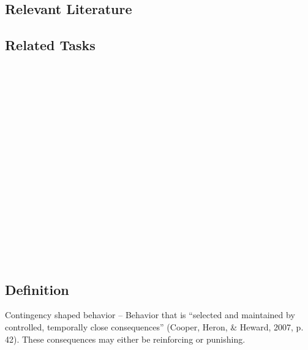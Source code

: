 \subsection{Relevant Literature}
\begin{refsection}
\nocite{alessi1992models,
        cooper2007applied,
        higgins2001effects,
        michael2004concepts,
        morse1977determinants}
\printbibliography[heading=none]
\end{refsection}
%
\subsection{Related Tasks}
\fourcOne{}\\
\fourdOne{}\\
\fourdTwo{}\\
\fourdTwenty{}\\
\fourdTwentyOne{}\\
\fourfTwo{}\\
\fourjFour{}\\
\fourkFour{}\\
\fourFKTwo{}\\
\fourFKFourteen{}\\
\fourFKFifteen{}\\
\fourFKSixteen{}\\
\fourFKSeventeen{}\\
\fourFKTwentyOne{}\\
\fourFKTwentySix{}\\
\fourFKTwentySeven{}\\
%
\clearpage \section{\fourFKFourtyOne{}}
\subsection{Definition}
Contingency shaped behavior – Behavior that is ``selected and maintained by controlled, temporally close consequences'' (Cooper, Heron, \& Heward, 2007, p. 42).  These consequences may either be reinforcing or punishing.  
%
